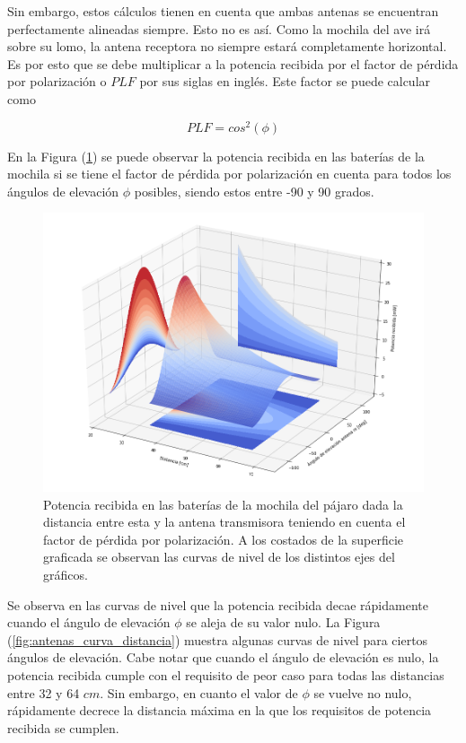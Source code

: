 Sin embargo, estos cálculos tienen en cuenta que ambas antenas se encuentran perfectamente alineadas siempre. Esto no es así. Como la mochila del ave irá sobre su lomo, la antena receptora no siempre estará completamente horizontal. Es por esto que se debe multiplicar a la potencia recibida por el factor de pérdida por polarización o $PLF$ por sus siglas en inglés. Este factor se puede calcular como

\begin{equation}
PLF = cos^2(\phi)
\end{equation}

En la Figura (\ref{fig:antenas_potrecibida}) se puede observar la potencia recibida en las baterías de la mochila si se tiene el factor de pérdida por polarización en cuenta para todos los ángulos de elevación $\phi$ posibles, siendo estos entre -90 y 90 grados.

\begin{figure}[H]
	\centering
	\includegraphics[width=\linewidth]{ImagenesFactibilidad/antenas_potrecibida}
	\caption{Potencia recibida en las baterías de la mochila del pájaro dada la distancia entre esta y la antena transmisora teniendo en cuenta el factor de pérdida por polarización. A los costados de la superficie graficada se observan las curvas de nivel de los distintos ejes del gráficos.}
	\label{fig:antenas_potrecibida}
\end{figure}

Se observa en las curvas de nivel que la potencia recibida decae rápidamente cuando el ángulo de elevación $\phi$ se aleja de su valor nulo. La Figura (\ref{fig:antenas_curva_distancia}) muestra algunas curvas de nivel para ciertos ángulos de elevación. Cabe notar que cuando el ángulo de elevación es nulo, la potencia recibida cumple con el requisito de peor caso para todas las distancias entre 32 y 64 $cm$. Sin embargo, en cuanto el valor de $\phi$ se vuelve no nulo, rápidamente decrece la distancia máxima en la que los requisitos de potencia recibida se cumplen.

